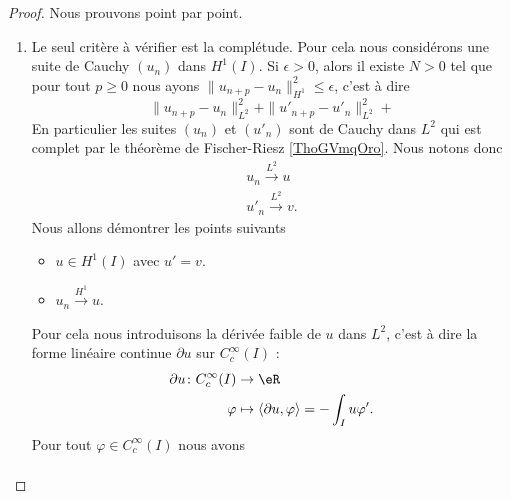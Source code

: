 \begin{proof}
    Nous prouvons point par point.
    \begin{enumerate}
        \item
            Le seul critère à vérifier est la complétude. Pour cela nous considérons une suite de Cauchy \( (u_n)\) dans \( H^1(I)\). Si \( \epsilon>0\), alors il existe \( N>0\) tel que pour tout \( p\geq 0\) nous ayons \( \| u_{n+p}-u_n \|_{H^1}^2\leq \epsilon\), c'est à dire
            \begin{equation}
                \| u_{n+p}-u_n \|^2_{L^2}+\| u'_{n+p}-u'_n \|^2_{L^2}+
            \end{equation}
            En particulier les suites \( (u_n)\) et \( (u'_n)\) sont de Cauchy dans \( L^2\) qui est complet par le théorème de Fischer-Riesz \ref{ThoGVmqOro}. Nous notons donc
            \begin{subequations}
                \begin{align}
                    u_n\stackrel{L^2}{\to}u\\
                    u'_n\stackrel{L^2}{\to}v.
                \end{align}
            \end{subequations}
            Nous allons démontrer les points suivants
            \begin{itemize}
                \item \( u\in H^1(I)\) avec \( u'=v\).
                \item \( u_n\stackrel{H^1}{\to}u\).
            \end{itemize}
            Pour cela nous introduisons la dérivée faible de \( u\) dans \( L^2\), c'est à dire la forme linéaire continue \( \partial u\) sur \(  C^{\infty}_c(I)\) :
            \begin{equation}
                \begin{aligned}
                    \partial u\colon  C^{\infty}_c(I)&\to \eR \\
                    \varphi&\mapsto \langle \partial u, \varphi\rangle =-\int_Iu\varphi'. 
                \end{aligned}
            \end{equation}
            Pour tout \( \varphi\in C^{\infty}_c(I)\) nous avons
            \begin{subequations}
                \begin{align}

\end{align}
\end{subequations}
\end{enumerate}
\end{proof}
